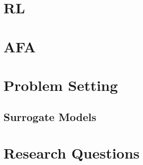 \documentclass[../main.tex]{subfiles}
\begin{document}
\section{RL} %

\section{AFA}

\section{Problem Setting} %

\subsection{Surrogate Models} %

\section{Research Questions} %
\end{document}
